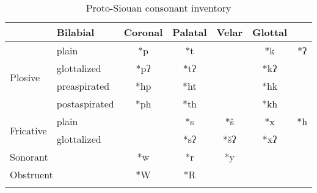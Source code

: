 \begin{table}
\begin{center}
\caption{Proto-Siouan consonant inventory}
\label{PSiconsonants}
\begin{tabular}{llccccc}
\lsptoprule
\multicolumn{2}{l}{}                     & \multicolumn{1}{l}{Bilabial} & \multicolumn{1}{l}{Coronal} & \multicolumn{1}{l}{Palatal} & \multicolumn{1}{l}{Velar} & \multicolumn{1}{l}{Glottal} \\
\midrule
\multirow{4}{*}{Plosive}   & plain         & *p                            & *t                           &                              & *k                         & *ʔ                           \\ %
                           & glottalized   & *pʔ                           & *tʔ                          &                              & *kʔ &                              \\ %
                           & preaspirated  & *hp                           & *ht                          &                              & *hk                        &                              \\ %
                           & postaspirated & *ph                           & *th                          &                              & *kh                        &                              \\
\multirow{2}{*}{Fricative} & plain         &                               & *s                           & *š                           & *x                         & *h                           \\ %
                           & glottalized   &                               & *sʔ                          & *šʔ                          & *xʔ                        &                              \\
\multicolumn{2}{l}{Sonorant}             & *w                            & *r                           & *y                           &                            &                              \\
\multicolumn{2}{l}{Obstruent}            & *W                            & *R                           &                              &                            &                              \\ \lspbottomrule
\end{tabular}
\end{center}
\end{table}

